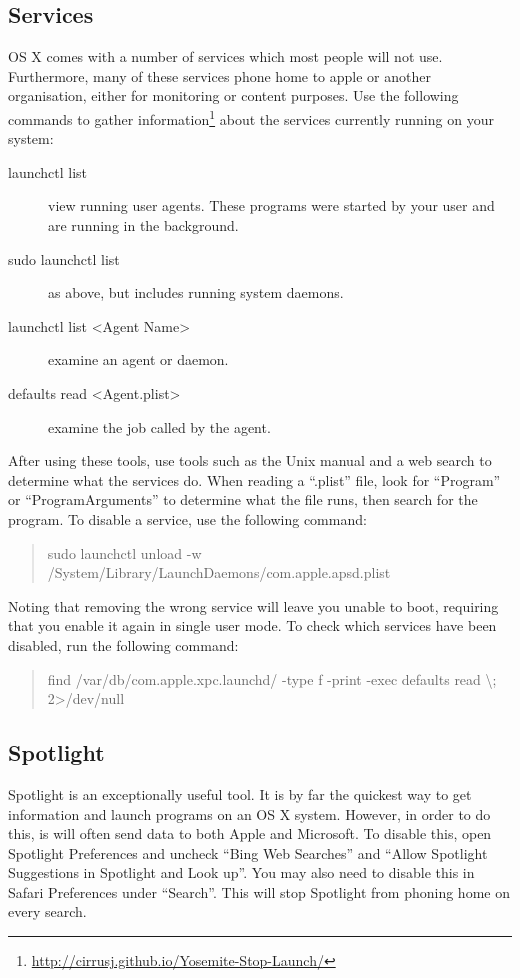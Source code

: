 \documentclass[a4paper,11pt]{report}
\begin{document}
			\subsection{Services}
				OS X comes with a number of services which most people will not use. 
				Furthermore, many of these services phone home to apple or another organisation, either for monitoring or content purposes. 
				Use the following commands to gather information\footnote{\url{http://cirrusj.github.io/Yosemite-Stop-Launch/}} about the services currently running on your system:
				\begin{description}
					\item[launchctl list]
						view running user agents. 
						These programs were started by your user and are running in the background. 
					\item[sudo launchctl list]
						as above, but includes running system daemons.
					\item[launchctl list <Agent Name>]
						examine an agent or daemon.
					\item[defaults read <Agent.plist>]
						examine the job called by the agent. 
				\end{description}
				After using these tools, use tools such as the Unix manual and a web search to determine what the services do. 
				When reading a ``.plist'' file, look for ``Program'' or ``ProgramArguments'' to determine what the file runs, then search for the program. 
				To disable a service, use the following command:
				\begin{quote}
					sudo launchctl unload -w /System/Library/LaunchDaemons/com.apple.apsd.plist
				\end{quote}
				Noting that removing the wrong service will leave you unable to boot, requiring that you enable it again in single user mode.
				To check which services have been disabled, run the following command:
				\begin{quote}
					find /var/db/com.apple.xpc.launchd/ -type f -print -exec defaults read {} \textbackslash; 2>/dev/null
				\end{quote}
			\subsection{Spotlight}
				Spotlight is an exceptionally useful tool. 
				It is by far the quickest way to get information and launch programs on an OS X system. 
				However, in order to do this, is will often send data to both Apple and Microsoft. 
				To disable this, open Spotlight Preferences and uncheck ``Bing Web Searches'' and ``Allow Spotlight Suggestions in Spotlight and Look up''. 
				You may also need to disable this in Safari Preferences under ``Search''. 
				This will stop Spotlight from phoning home on every search. 
\end{document}
